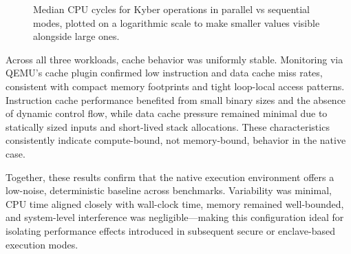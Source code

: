 \begin{figure}[h]
\centering
{}
\caption{Median CPU cycles for Kyber operations in parallel vs sequential modes, plotted on a logarithmic scale to make smaller values visible alongside large ones.}
\label{fig:kyber_median_cycles_chart_log}
\end{figure}



Across all three workloads, cache behavior was uniformly stable. Monitoring via QEMU’s cache plugin confirmed low instruction and data cache miss rates, consistent with compact memory footprints and tight loop-local access patterns. Instruction cache performance benefited from small binary sizes and the absence of dynamic control flow, while data cache pressure remained minimal due to statically sized inputs and short-lived stack allocations. These characteristics consistently indicate compute-bound, not memory-bound, behavior in the native case.

Together, these results confirm that the native execution environment offers a low-noise, deterministic baseline across benchmarks. Variability was minimal, CPU time aligned closely with wall-clock time, memory remained well-bounded, and system-level interference was negligible—making this configuration ideal for isolating performance effects introduced in subsequent secure or enclave-based execution modes.

